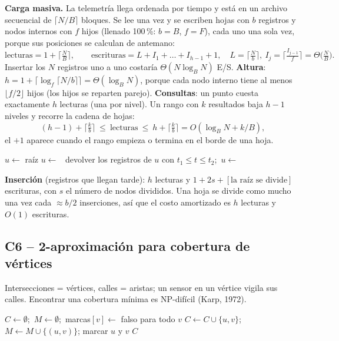 \documentclass[11pt,letterpaper]{article}
\theoremstyle{plain}
\theoremstyle{definition}
\newcommand{\Th}{\Theta}
\begin{document}
\textbf{Carga masiva.} La telemetría llega ordenada por tiempo y está en un archivo secuencial de
$\lceil N/B\rceil$ bloques. Se lee una vez y se escriben hojas con $b$ registros y nodos internos con $f$ hijos
(llenado 100\,\%: $b=B$, $f=F$), cada uno una sola vez, porque sus posiciones se calculan de antemano:
\[
\text{lecturas}=1+\Big\lceil\tfrac NB\Big\rceil,\qquad
\text{escrituras}=L+I_1+\dots+I_{h-1}+1,\quad L=\Big\lceil\tfrac Nb\Big\rceil,\ I_j=\Big\lceil\tfrac{I_{j-1}}f\Big\rceil
=\Th\!\Big(\tfrac NB\Big).
\]
Insertar los $N$ registros uno a uno costaría $\Th(N\log_B N)$ E/S.
\textbf{Altura}: $h=1+\lceil\log_f\lceil N/b\rceil\rceil=\Th(\log_B N)$, porque cada nodo interno tiene al
menos $\lfloor f/2\rfloor$ hijos (los hijos se reparten parejo).
\textbf{Consultas}: un punto cuesta exactamente $h$ lecturas (una por nivel). Un rango con $k$ resultados
baja $h-1$ niveles y recorre la cadena de hojas:
\[
(h-1)+\Big\lceil\tfrac kb\Big\rceil\ \le\ \text{lecturas}\ \le\ h+\Big\lceil\tfrac kb\Big\rceil=O(\log_B N+k/B),
\]
el $+1$ aparece cuando el rango empieza o termina en el borde de una hoja.
\begin{algorithm}[H]
\caption{\textsc{Rango}$(t_1,t_2)$ \small(cada nodo es un bloque; toda lectura pasa por \texttt{DiscoSimulado})}
\small
\begin{algorithmic}[1]
\State $u\gets$ raíz 
 $u\gets$  \EndWhile
\Repeat\ devolver los registros de $u$ con $t_1\le t\le t_2$;\ $u\gets$ 
 
\end{algorithmic}
\end{algorithm}

\textbf{Inserción} (registros que llegan tarde): $h$ lecturas y $1+2s+[\text{la raíz se divide}]$
escrituras, con $s$ el número de nodos divididos. Una hoja se divide como mucho una vez cada $\approx b/2$
inserciones, así que el costo amortizado es $h$ lecturas y $O(1)$ escrituras.

\subsection{C6 -- 2-aproximación para cobertura de vértices}

Intersecciones = vértices, calles = aristas; un sensor en un vértice vigila sus calles. Encontrar una
cobertura mínima es NP-difícil (Karp, 1972).
\begin{algorithm}[H]
\caption{\textsc{Cobertura2Aprox}$(V, E)$}
\small
\begin{algorithmic}[1]
\State $C\gets\emptyset$;\ $M\gets\emptyset$;\ marcas$[v]\gets$ falso para todo $v$ \Comment{$\Th(V)$}
 \Comment{$\Th(E)$}
   $C\gets C\cup\{u,v\}$;\ $M\gets M\cup\{(u,v)\}$; marcar $u$ y $v$ \EndIf
\EndFor
\State \Return $C$ \Comment{total $\Th(V+E)$}
\end{algorithmic}
\end{algorithm}
\end{document}
